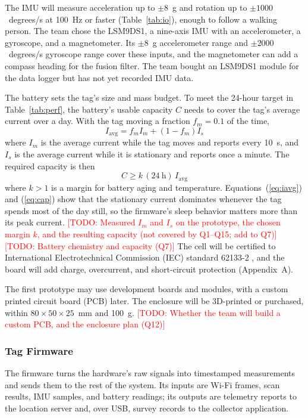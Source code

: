 \documentclass[12pt,letterpaper]{article}
\newcommand{\TODO}[1]{\textcolor{red}{[TODO: #1]}}
\begin{document}
The IMU will measure acceleration up to $\pm 8$~g and rotation up to $\pm 1000$~degrees/s at 100~Hz
or faster (Table~\ref{tab:io}), enough to follow a walking person. The team chose the LSM9DS1, a
nine-axis IMU with an accelerometer, a gyroscope, and a magnetometer. Its $\pm 8$~g accelerometer
range and $\pm 2000$~degrees/s gyroscope range cover these inputs, and the magnetometer can add a
compass heading for the fusion filter. The team bought an LSM9DS1 module for the data logger but has
not yet recorded IMU data.

The battery sets the tag's size and mass budget. To meet the 24-hour target in Table~\ref{tab:perf},
the battery's usable capacity $C$ needs to cover the tag's average current over a day. With the tag
moving a fraction $f_m = 0.1$ of the time,
\begin{equation}
  I_{\mathrm{avg}} = f_m I_m + (1 - f_m) I_s
  \label{eq:iavg}
\end{equation}
where $I_m$ is the average current while the tag moves and reports every 10~s, and $I_s$ is the
average current while it is stationary and reports once a minute. The required capacity is then
\begin{equation}
  C \geq k \, (24~\mathrm{h}) \, I_{\mathrm{avg}}
  \label{eq:cap}
\end{equation}
where $k > 1$ is a margin for battery aging and temperature. Equations~(\ref{eq:iavg}) and
(\ref{eq:cap}) show that the stationary current dominates whenever the tag spends most of the day
still, so the firmware's sleep behavior matters more than its peak current. \TODO{Measured $I_m$ and
$I_s$ on the prototype, the chosen margin $k$, and the resulting capacity (not covered by Q1--Q15;
add to Q7)} \TODO{Battery chemistry and capacity (Q7)} The cell will be certified to International
Electrotechnical Commission (IEC) standard 62133-2 \cite{iec62133}, and the board will add charge, overcurrent, and short-circuit protection (Appendix~A).

The first prototype may use development boards and modules, with a custom printed circuit board
(PCB) later. The enclosure will be 3D-printed or purchased, within $80 \times 50 \times 25$~mm and
100~g. \TODO{Whether the team will build a custom PCB, and the enclosure plan (Q12)}

\subsubsection{Tag Firmware}
The firmware turns the hardware's raw signals into timestamped measurements and sends them to the
rest of the system. Its inputs are Wi-Fi frames, scan results, IMU samples, and battery readings; its
outputs are telemetry reports to the location server and, over USB, survey records to the collector
application.
\end{document}
